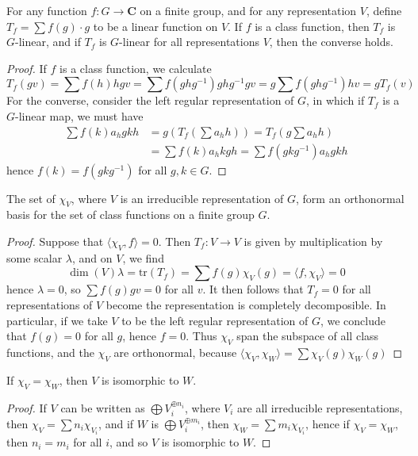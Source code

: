 \begin{theorem}
    For any function $f: G \to \mathbf{C}$ on a finite group, and for any representation $V$, define $T_f = \sum f(g) \cdot g$ to be a linear function on $V$. If $f$ is a class function, then $T_f$ is $G$-linear, and if $T_f$ is $G$-linear for all representations $V$, then the converse holds.
\end{theorem}
\begin{proof}
    If $f$ is a class function, we calculate
    \[ T_f(gv) = \sum f(h) hgv = \sum f(ghg^{-1}) ghg^{-1}gv = g \sum f(ghg^{-1}) hv = g T_f(v) \]
    For the converse, consider the left regular representation of $G$, in which if $T_f$ is a $G$-linear map, we must have
    \begin{align*}
        \sum f(k) a_h gkh &= g \left( T_f \left( \sum a_h h \right) \right) = T_f \left( g \sum a_h h \right)\\
        &= \sum f(k) a_h kgh = \sum f(gkg^{-1}) a_h gkh
    \end{align*}
    hence $f(k) = f(gkg^{-1})$ for all $g, k \in G$.
\end{proof}

\begin{theorem}
    The set of $\chi_V$, where $V$ is an irreducible representation of $G$, form an orthonormal basis for the set of class functions on a finite group $G$.
\end{theorem}
\begin{proof}
    Suppose that $\langle \chi_V, f \rangle = 0$. Then $T_f: V \to V$ is given by multiplication by some scalar $\lambda$, and on $V$, we find
    \[ \dim(V) \lambda = \text{tr}(T_f) = \sum f(g) \chi_V(g) = \langle f, \chi_V \rangle = 0 \]
    hence $\lambda = 0$, so $\sum f(g) gv = 0$ for all $v$. It then follows that $T_f = 0$ for all representations of $V$ become the representation is completely decomposible. In particular, if we take $V$ to be the left regular representation of $G$, we conclude that $f(g) = 0$ for all $g$, hence $f = 0$. Thus $\chi_V$ span the subspace of all class functions, and the $\chi_V$ are orthonormal, because $\langle \chi_V, \chi_W \rangle = \sum \chi_V(g) \chi_W(g)$
\end{proof}

\begin{corollary}
    If $\chi_V = \chi_W$, then $V$ is isomorphic to $W$.
\end{corollary}
\begin{proof}
    If $V$ can be written as $\bigoplus V_i^{\oplus n_i}$, where $V_i$ are all irreducible representations, then $\chi_V = \sum n_i \chi_{V_i}$, and if $W$ is $\bigoplus V_i^{\oplus m_i}$, then $\chi_W = \sum m_i \chi_{V_i}$, hence if $\chi_V = \chi_W$, then $n_i = m_i$ for all $i$, and so $V$ is isomorphic to $W$.
\end{proof}

